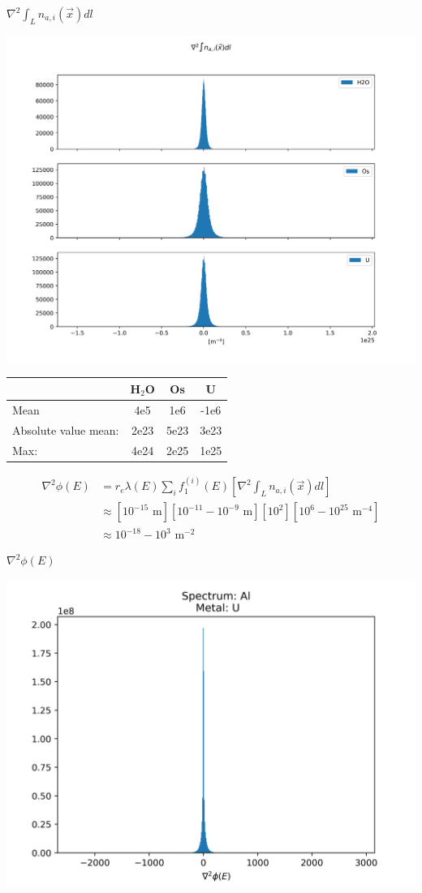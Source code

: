 \documentclass[presentation]{beamer}
\begin{document}
\begin{frame}{$\nabla^2\int_L n_{a,i}(\vec{x}) dl$}

  \centering
  \includegraphics[width=0.75\linewidth]{figs/laplacians}

  \begin{tabular}{l | c c c}
    & H$_2$O & Os & U\\
    \hline
    Mean & 4e5 & 1e6 & -1e6\\
    Absolute value mean: & 2e23 & 5e23 & 3e23\\
    Max: & 4e24 & 2e25 & 1e25
  \end{tabular}  
    
\end{frame}

\begin{frame}
  \begin{align}
    \nabla^2 \phi(E) &= r_e \lambda(E) \sum_i f_1^{(i)}(E) \left[\nabla^2 \int_L n_{a,i}(\vec{x})dl\right]\\
                     &\approx [10^{-15} \text{ m}][10^{-11} - 10^{-9} \text{ m}][10^2][10^{6} - 10^{25} \text{ m}^{-4}]\\
                     &\approx 10^{-18} - 10^{3} \text{ m}^{-2}
  \end{align}

  \end{frame}

  \begin{frame}{$\nabla^2 \phi(E)$}

    \centering
    \includegraphics[width=0.8\linewidth]{figs/lap_phi}
  \end{frame}
\end{document}
